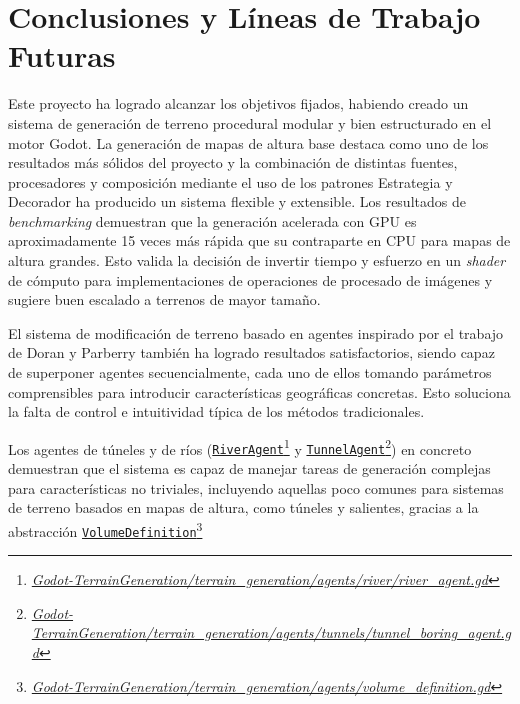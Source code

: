 
\chapter{Conclusiones y Líneas de Trabajo Futuras} \label{chap:Conclusiones} 
Este proyecto ha logrado alcanzar los objetivos fijados, habiendo creado un sistema de generación de terreno procedural modular y bien estructurado en el motor Godot.
La generación de mapas de altura base destaca como uno de los resultados más sólidos del proyecto y la combinación de distintas fuentes, procesadores y composición mediante el uso de los patrones Estrategia y Decorador ha producido un sistema flexible y extensible.
Los resultados de \textit{benchmarking} demuestran que la generación acelerada con GPU es aproximadamente 15 veces más rápida que su contraparte en CPU para mapas de altura grandes.
Esto valida la decisión de invertir tiempo y esfuerzo en un \textit{shader} de cómputo para implementaciones de operaciones de procesado de imágenes y sugiere buen escalado a terrenos de mayor tamaño.

El sistema de modificación de terreno basado en agentes inspirado por el trabajo de Doran y Parberry \cite{Doran:2010:CPT} también ha logrado resultados satisfactorios, siendo capaz de superponer agentes secuencialmente, cada uno de ellos tomando parámetros comprensibles para introducir características geográficas concretas.
Esto soluciona la falta de control e intuitividad típica de los métodos tradicionales.

Los agentes de túneles y de ríos (\href{{https://github.com/fsande/TFG---Eric-Rios/blob/main/Godot-TerrainGeneration/terrain_generation/agents/river/river_agent.gd}}{\texttt{RiverAgent}}\footnote{\href{{https://github.com/fsande/TFG---Eric-Rios/blob/main/Godot-TerrainGeneration/terrain_generation/agents/river/river_agent.gd}}{\textit{Godot-TerrainGeneration/terrain\_generation/agents/river/river\_agent.gd}}} y \href{{https://github.com/fsande/TFG---Eric-Rios/tree/main/Godot-TerrainGeneration/terrain_generation/agents/tunnels}}{\texttt{TunnelAgent}}\footnote{\href{{https://github.com/fsande/TFG---Eric-Rios/tree/main/Godot-TerrainGeneration/terrain_generation/agents/tunnels}}{\textit{Godot-TerrainGeneration/terrain\_generation/agents/tunnels/tunnel\_boring\_agent.gd}}}) en concreto demuestran que el sistema es capaz de manejar tareas de generación complejas para características no triviales, incluyendo aquellas poco comunes para sistemas de terreno basados en mapas de altura, como túneles y salientes, gracias a la abstracción \href{{https://github.com/fsande/TFG---Eric-Rios/blob/main/Godot-TerrainGeneration/terrain_generation/agents/volume_definition.gd}}{\texttt{VolumeDefinition}}\footnote{\href{{https://github.com/fsande/TFG---Eric-Rios/blob/main/Godot-TerrainGeneration/terrain_generation/agents/volume_definition.gd}}{\textit{Godot-TerrainGeneration/terrain\_generation/agents/volume\_definition.gd}}}

